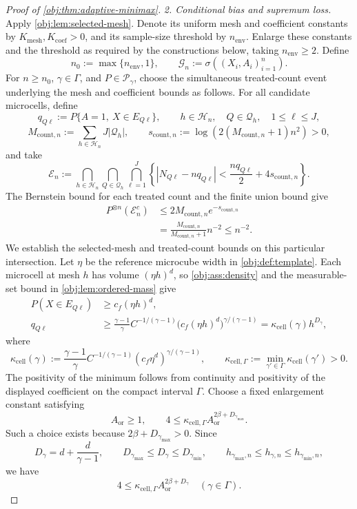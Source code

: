 \begin{proof}[Proof of \cref{obj:thm:adaptive-minimax}]
\emph{2. Conditional bias and supremum loss.}
Apply \cref{obj:lem:selected-mesh}. Denote its uniform mesh and coefficient constants by \(K_{\mathrm{mesh}},K_{\mathrm{coef}}>0\), and its sample-size threshold by \(n_{\mathrm{env}}\). Enlarge these constants and the threshold as required by the constructions below, taking \(n_{\mathrm{env}}\ge2\). Define
\[
n_0:=\max\{n_{\mathrm{env}},1\},
\qquad
\mathcal G_n:=\sigma((X_i,A_i)_{i=1}^n).
\]
For \(n\ge n_0\), \(\gamma\in\Gamma\), and \(P\in\mathcal P_\gamma\), choose the simultaneous treated-count event underlying the mesh and coefficient bounds as follows. For all candidate microcells, define
\[
q_{Q\ell}:=P\{A=1,\ X\in E_{Q\ell}\},
\qquad h\in\mathcal H_n,\quad Q\in\mathcal Q_h,\quad 1\le\ell\le J,
\]
\[
M_{\mathrm{count},n}
:=\sum_{h\in\mathcal H_n}J|\mathcal Q_h|,
\qquad
s_{\mathrm{count},n}
:=\log\!\left(2(M_{\mathrm{count},n}+1)n^2\right)>0,
\]
and take
\[
\mathcal E_n
:=
\bigcap_{h\in\mathcal H_n}
\bigcap_{Q\in\mathcal Q_h}
\bigcap_{\ell=1}^J
\left\{
\left|N_{Q\ell}-nq_{Q\ell}\right|
<\frac{nq_{Q\ell}}2+4s_{\mathrm{count},n}
\right\}.
\]
The Bernstein bound for each treated count and the finite union bound give
\[
\begin{aligned}
P^{\otimes n}(\mathcal E_n^c)
&\le 2M_{\mathrm{count},n}e^{-s_{\mathrm{count},n}}
\\
&=\frac{M_{\mathrm{count},n}}{M_{\mathrm{count},n}+1}n^{-2}
\le n^{-2}.
\end{aligned}
\]
We establish the selected-mesh and treated-count bounds on this particular intersection. Let \(\eta\) be the reference microcube width in \cref{obj:def:template}. Each microcell at mesh \(h\) has volume \((\eta h)^d\), so \cref{obj:ass:density} and the measurable-set bound in \cref{obj:lem:ordered-mass} give
\[
\begin{aligned}
P(X\in E_{Q\ell})&\ge c_f(\eta h)^d,\\
q_{Q\ell}
&\ge \frac{\gamma-1}{\gamma}C^{-1/(\gamma-1)}
\bigl(c_f(\eta h)^d\bigr)^{\gamma/(\gamma-1)}
=\kappa_{\mathrm{cell}}(\gamma)h^{D_\gamma},
\end{aligned}
\]
where
\[
\kappa_{\mathrm{cell}}(\gamma)
:=\frac{\gamma-1}{\gamma}C^{-1/(\gamma-1)}
(c_f\eta^d)^{\gamma/(\gamma-1)},
\qquad
\kappa_{\mathrm{cell},\Gamma}
:=\min_{\gamma'\in\Gamma}\kappa_{\mathrm{cell}}(\gamma')>0.
\]
The positivity of the minimum follows from continuity and positivity of the displayed coefficient on the compact interval \(\Gamma\). Choose a fixed enlargement constant satisfying
\[
A_{\mathrm{or}}\ge1,
\qquad
4\le\kappa_{\mathrm{cell},\Gamma}
A_{\mathrm{or}}^{2\beta+D_{\gamma_{\max}}}.
\]
Such a choice exists because \(2\beta+D_{\gamma_{\max}}>0\). Since
\[
D_\gamma=d+\frac d{\gamma-1},
\qquad
D_{\gamma_{\max}}\le D_\gamma\le D_{\gamma_{\min}},
\qquad
h_{\gamma_{\max},n}\le h_{\gamma,n}\le h_{\gamma_{\min},n},
\]
we have
\[
4\le\kappa_{\mathrm{cell},\Gamma}
A_{\mathrm{or}}^{2\beta+D_\gamma}
\quad(\gamma\in\Gamma).
\]


\end{proof}
